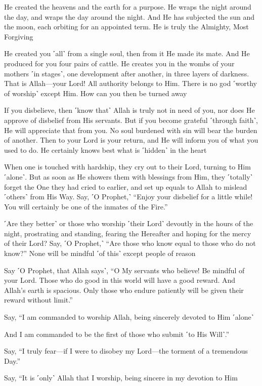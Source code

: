 He created the heavens and the earth for a purpose. He wraps the night around the day, and wraps the day around the night. And He has subjected the sun and the moon, each orbiting for an appointed term. He is truly the Almighty, Most Forgiving

He created you ˹all˺ from a single soul, then from it He made its mate. And He produced for you four pairs of cattle. He creates you in the wombs of your mothers ˹in stages˺, one development after another, in three layers of darkness. That is Allah—your Lord! All authority belongs to Him. There is no god ˹worthy of worship˺ except Him. How can you then be turned away

If you disbelieve, then ˹know that˺ Allah is truly not in need of you, nor does He approve of disbelief from His servants. But if you become grateful ˹through faith˺, He will appreciate that from you. No soul burdened with sin will bear the burden of another. Then to your Lord is your return, and He will inform you of what you used to do. He certainly knows best what is ˹hidden˺ in the heart

When one is touched with hardship, they cry out to their Lord, turning to Him ˹alone˺. But as soon as He showers them with blessings from Him, they ˹totally˺ forget the One they had cried to earlier, and set up equals to Allah to mislead ˹others˺ from His Way. Say, ˹O Prophet,˺ “Enjoy your disbelief for a little while! You will certainly be one of the inmates of the Fire.”

˹Are they better˺ or those who worship ˹their Lord˺ devoutly in the hours of the night, prostrating and standing, fearing the Hereafter and hoping for the mercy of their Lord? Say, ˹O Prophet,˺ “Are those who know equal to those who do not know?” None will be mindful ˹of this˺ except people of reason

Say ˹O Prophet, that Allah says˺, “O My servants who believe! Be mindful of your Lord. Those who do good in this world will have a good reward. And Allah’s earth is spacious. Only those who endure patiently will be given their reward without limit.”

Say, “I am commanded to worship Allah, being sincerely devoted to Him ˹alone˺

And I am commanded to be the first of those who submit ˹to His Will˺.”

Say, “I truly fear—if I were to disobey my Lord—the torment of a tremendous Day.”

Say, “It is ˹only˺ Allah that I worship, being sincere in my devotion to Him

